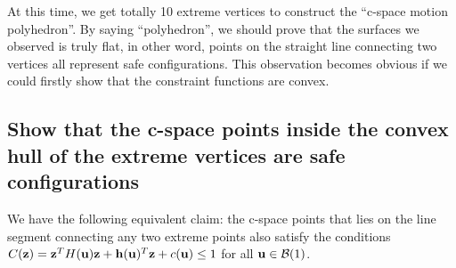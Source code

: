 \documentclass{article}
\begin{document}
At this time, we get totally 10 extreme vertices to construct the ``c-space motion polyhedron''. By saying ``polyhedron'', we should prove that the surfaces we observed is truly flat, in other word, points on the straight line connecting two vertices all represent safe configurations. This observation becomes obvious if we could firstly show that the constraint functions are convex.

\subsection{Show that the c-space points inside the convex hull of the extreme vertices are safe configurations}
We have the following equivalent claim: the c-space points that lies on the line segment connecting any two extreme points also satisfy the conditions $C({\bf z}) = {\bf z}^T H({\bf u}) {\bf z} + {\bf h}({\bf u})^T {\bf z} + c({\bf u}) \leq 1$ for all ${\bf u} \in \mathcal{B}(1)$.
\end{document}
